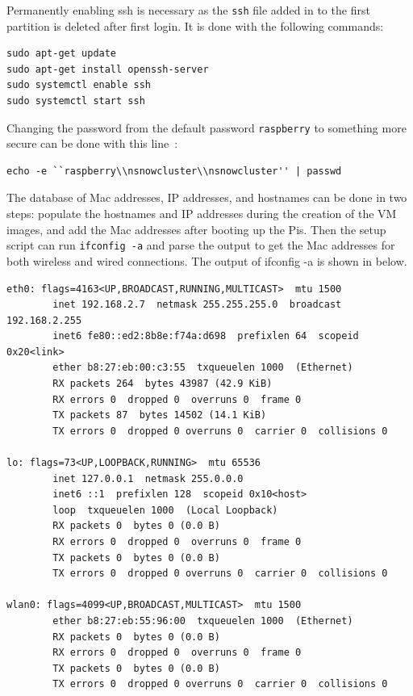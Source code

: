 Permanently enabling ssh is necessary as the \verb|ssh| file added in
to the first partition is deleted after first login. It is done with
the following commands:
\begin{verbatim} 
sudo apt-get update
sudo apt-get install openssh-server
sudo systemctl enable ssh
sudo systemctl start ssh
\end{verbatim}

Changing the password from the default password \verb|raspberry| to
something more secure can be done with this
line~\cite{hid-sp18-419-so-password}:
\begin{verbatim} 
echo -e ``raspberry\\nsnowcluster\\nsnowcluster'' | passwd
\end{verbatim}

The database of Mac addresses, IP addresses, and hostnames can be done
in two steps: populate the hostnames and IP addresses during the
creation of the VM images, and add the Mac addresses after booting up
the Pis. Then the setup script can run \verb|ifconfig -a| and parse
the output to get the Mac addresses for both wireless and wired
connections. The output of ifconfig -a is shown in below.
\begin{verbatim} 
eth0: flags=4163<UP,BROADCAST,RUNNING,MULTICAST>  mtu 1500
        inet 192.168.2.7  netmask 255.255.255.0  broadcast 192.168.2.255
        inet6 fe80::ed2:8b8e:f74a:d698  prefixlen 64  scopeid 0x20<link>
        ether b8:27:eb:00:c3:55  txqueuelen 1000  (Ethernet)
        RX packets 264  bytes 43987 (42.9 KiB)
        RX errors 0  dropped 0  overruns 0  frame 0
        TX packets 87  bytes 14502 (14.1 KiB)
        TX errors 0  dropped 0 overruns 0  carrier 0  collisions 0

lo: flags=73<UP,LOOPBACK,RUNNING>  mtu 65536
        inet 127.0.0.1  netmask 255.0.0.0
        inet6 ::1  prefixlen 128  scopeid 0x10<host>
        loop  txqueuelen 1000  (Local Loopback)
        RX packets 0  bytes 0 (0.0 B)
        RX errors 0  dropped 0  overruns 0  frame 0
        TX packets 0  bytes 0 (0.0 B)
        TX errors 0  dropped 0 overruns 0  carrier 0  collisions 0

wlan0: flags=4099<UP,BROADCAST,MULTICAST>  mtu 1500
        ether b8:27:eb:55:96:00  txqueuelen 1000  (Ethernet)
        RX packets 0  bytes 0 (0.0 B)
        RX errors 0  dropped 0  overruns 0  frame 0
        TX packets 0  bytes 0 (0.0 B)
        TX errors 0  dropped 0 overruns 0  carrier 0  collisions 0
\end{verbatim}

